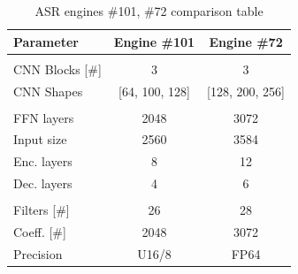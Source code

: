 \begin{table}[H]
    \centering
\begin{tabular}{ !{\color{ytblborder}\vrule}l!{\color{ytblborder}\vrule}cc| } 
    \hline

    \hline
     \color{white}\bf{Parameter} 
    & \color{white}\bf{Engine \#101} 
    & \color{white}\bf{Engine \#72} \\
    \hline

    \hline\hline
       \\
    \hline

    \hline
      CNN Blocks [\#]  
        & 3 
        & 3 \\
    \hline
    
    \hline
      CNN Shapes  
        & [64, 100, 128]
        & [128, 200, 256] \\
    \hline

    \hline\hline
       \\
    \hline

    \hline
      FFN layers  
        & 2048
        & 3072 \\
    \hline

    \hline
      Input size
        & 2560
        & 3584 \\
    \hline

    \hline
      Enc. layers
        & 8
        & 12 \\
    \hline

    \hline
      Dec. layers
        & 4
        & 6 \\
    \hline


    \hline\hline
       \\
    \hline

    \hline
      Filters [\#] 
        & 26
        & 28 \\
    \hline

    \hline
     Coeff. [\#]  
        & 2048
        & 3072 \\
    \hline

    \hline
     Precision  
        & U16/8
        & FP64 \\
    \hline

    \hline
\end{tabular}
\caption{ASR engines \#101, \#72 comparison table}
\label{tbl:engine_101_72}
\end{table}


